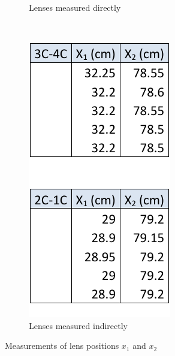 \documentclass{scrreprt}
\begin{document}
\begin{figure}[H]
\begin{subfigure}[b]{0.3\textwidth}
                \caption{Lenses measured directly}
                \label{fig:direct}
        \end{subfigure}%
        ~
        \begin{subfigure}[b]{0.345\textwidth}
                \centering
                \includegraphics[width=\textwidth]{diag/two_lenses.pdf}
                \caption{Lenses measured indirectly}
                \label{fig:indirect}
        \end{subfigure}
        \caption{Measurements of lens positions $x_1$ and $x_2$}
        \label{fig:measurements}
\end{figure}
\end{document}
